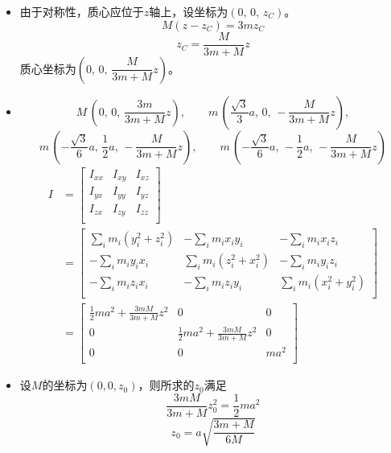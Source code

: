 \documentclass[a4paper,fontset=windows]{ctexart}
\begin{document}
\begin{itemize}
        \bigskip
        \item[6.(a)]
        由于对称性，质心应位于$z$轴上，设坐标为$(0,\, 0,\, z_C)$。
        \[
        M(z-z_C) = 3mz_C
        \]
        \[
        z_C = \frac{M}{3m+M}z
        \]
        质心坐标为$\left(0,\, 0,\, \dfrac{M}{3m+M}z\right)$。

        \medskip
        \item[6.(b)]
        \[
        M \, \left(0,\, 0,\, \frac{3m}{3m+M}z\right),\qquad m \, \left(\frac{\sqrt{3}}{3}a,\, 0,\, -\frac{M}{3m+M}z\right),
        \]
        \[
        m \, \left(-\frac{\sqrt{3}}{6}a,\, \frac{1}{2}a,\, -\frac{M}{3m+M}z\right),\qquad m \, \left(-\frac{\sqrt{3}}{6}a,\, -\frac{1}{2}a,\, -\frac{M}{3m+M}z\right)
        \]
        \begin{align*}
        I
        &=
        \begin{bmatrix}
        I_{xx} & I_{xy} & I_{xz} \\
        I_{yx} & I_{yy} & I_{yz} \\
        I_{zx} & I_{zy} & I_{zz} \\
        \end{bmatrix} \\
        &=
        \begin{bmatrix}
        \sum\limits_{i}m_i\left(y_i^2+z_i^2\right) & -\sum\limits_{i}m_ix_iy_i & -\sum\limits_{i}m_ix_iz_i \\
        -\sum\limits_{i}m_iy_ix_i & \sum\limits_{i}m_i\left(z_i^2+x_i^2\right) & -\sum\limits_{i}m_iy_iz_i \\
        -\sum\limits_{i}m_iz_ix_i & -\sum\limits_{i}m_iz_iy_i & \sum\limits_{i}m_i\left(x_i^2+y_i^2\right) \\
        \end{bmatrix} \\
        &=
        \begin{bmatrix}
        \frac{1}{2}ma^2 + \frac{3mM}{3m+M}z^2 & 0 & 0 \\
        0 & \frac{1}{2}ma^2 + \frac{3mM}{3m+M}z^2 & 0 \\
        0 & 0 & ma^2 \\
        \end{bmatrix}
        \end{align*}

        \medskip
        \item[6.(c)]
        设$M$的坐标为$(0,0,z_0)$，则所求的$z_0$满足
        \[
        \frac{3mM}{3m+M}z_0^2 = \frac{1}{2}ma^2
        \]
        \[
        z_0 = a\sqrt{\frac{3m+M}{6M}}
        \]


\end{itemize}
\end{document}
